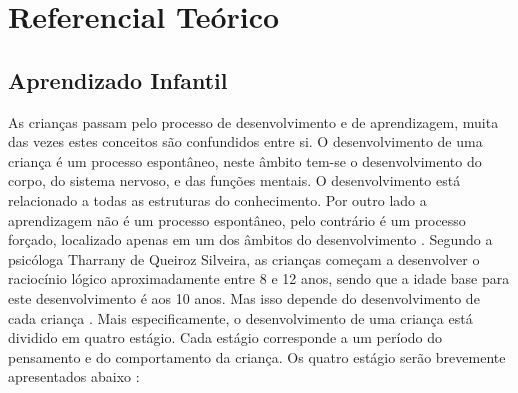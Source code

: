 \section{Referencial Teórico}

\subsection{Aprendizado Infantil}

As crianças passam pelo processo de desenvolvimento e de aprendizagem, muita das vezes estes conceitos são confundidos entre si. O desenvolvimento de uma criança é um processo espontâneo, neste âmbito tem-se o desenvolvimento do corpo, do sistema nervoso, e das funções mentais. O desenvolvimento está relacionado a todas as estruturas do conhecimento. Por outro lado a aprendizagem não é um processo espontâneo, pelo contrário é um processo forçado, localizado apenas em um dos âmbitos do desenvolvimento \cite{piaget:1972}.
Segundo a psicóloga Tharrany de Queiroz Silveira, as crianças começam a desenvolver o raciocínio lógico aproximadamente entre 8 e 12 anos,  sendo que a idade base para este desenvolvimento é aos 10 anos. Mas isso depende do desenvolvimento de cada criança \cite{silveira:2015}.
Mais especificamente, o desenvolvimento de uma criança está dividido em quatro estágio. Cada estágio corresponde a um período do pensamento e do comportamento da criança. Os quatro estágio serão brevemente apresentados abaixo \cite{piaget:1972}:

